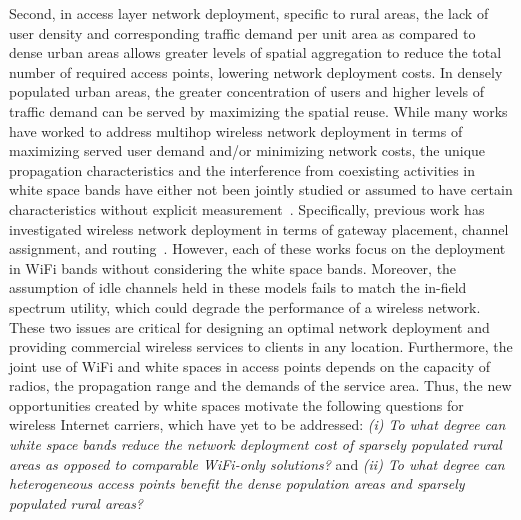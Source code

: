 Second, in access layer network deployment, specific to rural areas, the lack of user density 
and corresponding traffic demand per unit area as compared to dense urban areas allows greater 
levels of spatial aggregation to reduce the total number of required access points, lowering 
network deployment costs. In densely populated urban areas, the greater concentration of users 
and higher levels of traffic demand can be served by maximizing the spatial reuse. While many 
works have worked to address multihop wireless network deployment in terms of maximizing served 
user demand and/or minimizing network costs, the unique propagation characteristics and the 
interference from coexisting activities in white space bands have either not been jointly studied 
or assumed to have certain characteristics without explicit measurement~\cite{si2010overview}. 
Specifically, previous work has investigated wireless network deployment in terms of gateway 
placement, channel assignment, and routing~\cite{he2008optimizing,marina2010topology}. However, 
each of these works focus on the deployment in WiFi bands without considering the white space 
bands. Moreover, the assumption of idle channels held in these models fails to match the in-field 
spectrum utility, which could degrade the performance of a wireless network. These two issues 
are critical for designing an optimal network deployment and providing commercial wireless 
services to clients in any location.
Furthermore, the joint use of WiFi and white spaces  in access points depends on the capacity of 
radios, the propagation range and the demands of the service area. Thus, the new opportunities 
created by white spaces motivate the following questions for wireless Internet carriers, which 
have yet to be addressed: {\it (i) To what degree can white space bands reduce the network deployment 
cost of sparsely populated rural areas as opposed to comparable WiFi-only solutions?} and 
{\it (ii) To what degree can heterogeneous access points benefit the dense population areas and 
sparsely populated rural areas?}

